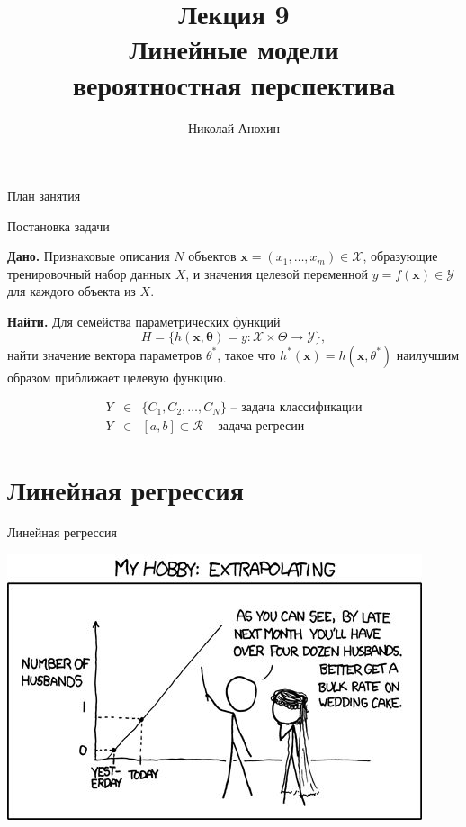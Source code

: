 \documentclass[aspectratio=169]{beamer}
\author{Николай Анохин}
\title{\newline \newline \newline Лекция 9 \\ Линейные модели \\ вероятностная перспектива}
\let\otp\titlepage
\renewcommand{\titlepage}{\otp\addtocounter{framenumber}{-1}}
\begin{document}
\begin{frame}[plain]
\titlepage
\end{frame}

\begin{frame}{План занятия}
\tableofcontents
\end{frame}

\begin{frame}{Постановка задачи}

{\bf Дано.} Признаковые описания $N$ объектов $\mathbf{x} = (x_1, \ldots, x_m) \in \mathcal{X}$, образующие тренировочный набор данных $X$, и значения целевой переменной $y = f(\mathbf{x}) \in \mathcal{Y}$ для каждого объекта из $X$. 

\vspace{1em}
{\bf Найти.} Для семейства параметрических функций 
\[
H = \{h(\mathbf{x, \mathbf{\theta}}) = y: \mathcal{X} \times \Theta \rightarrow \mathcal{Y}\},
\]
найти значение вектора параметров $\theta^*$, такое что $h^*(\mathbf{x}) = h(\mathbf{x}, \theta^*)$ наилучшим образом приближает целевую функцию.

\begin{eqnarray*}
Y & \in & \{C_1, C_2, \ldots, C_N\} \text{ -- задача классификации}  \\
Y & \in & [a, b] \subset \mathcal{R} \text{ -- задача регресии}
\end{eqnarray*}

\end{frame}


\section{Линейная регрессия}


\begin{frame}{}

\begin{center}
\Large Линейная регрессия

\vspace{1em}
\includegraphics[height=0.7\textheight]{images/lr_joke.jpg}
\end{center}

\end{frame}
\end{document}
